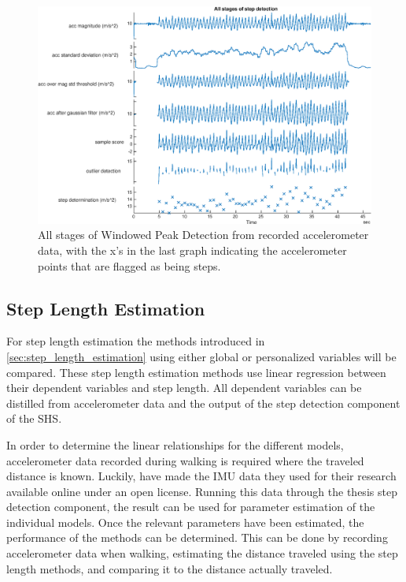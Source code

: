\begin{figure}[H]
	\centering
	\includegraphics[width=1\linewidth]{images/20200924_1204_All_stages_of_step_detection}
	\caption[All stages of Windowed Peak Detection ]{All stages of Windowed Peak Detection from recorded accelerometer data, with the x's in the last graph indicating the accelerometer points that are flagged as being steps. }
	\label{fig:all_stages_of_step_detection}
\end{figure}

\subsection{Step Length Estimation}
For step length estimation the methods introduced in \cref{sec:step_length_estimation} using either global or personalized variables will be compared. These step length estimation methods use linear regression between their dependent variables and step length. All dependent variables can be distilled from accelerometer data and the output of the step detection component of the \ac{SHS}. \par 

In order to determine the linear relationships for the different models, accelerometer data recorded during walking is required where the traveled distance is known. Luckily, \cite{Vezocnik2019} have made the IMU data they used for their research available online under an open license. Running this data through the thesis step detection component, the result can be used for parameter estimation of the individual models. Once the relevant parameters have been estimated, the performance of the methods can be determined. This can be done by recording accelerometer data when walking, estimating the distance traveled using the step length methods, and comparing it to the distance actually traveled.


